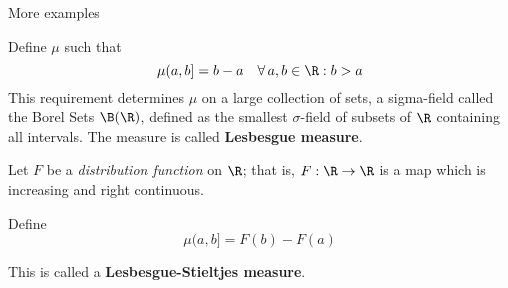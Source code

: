 \documentclass[10pt]{beamer}
\begin{document}
\begin{frame}{More examples}
\begin{example}
Define $\mu$ such that 
\[ \mu(a,b] = b-a \quad \forall \, a,b \in \R : b>a \]
This requirement determines $\mu$ on a large collection of sets, a sigma-field called the Borel Sets $\B(\R)$, defined as the smallest $\sigma$-field of subsets of $\R$ containing all intervals.  The measure is called \textbf{Lesbesgue measure}.
\end{example}
\pause 
\begin{example}
Let $F$ be a \textit{distribution function} on $\R$; that is, $F: \R \to \R$ is a map which is increasing and right continuous.


Define 
\[ \mu(a,b] = F(b) - F(a) \]

This is called a \textbf{Lesbesgue-Stieltjes measure}.
\end{example}
\end{frame}
\end{document}
